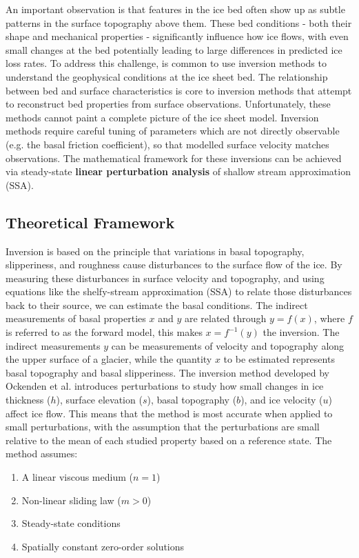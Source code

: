 An important observation is that features in the ice bed often show up as subtle patterns in the surface topography above them\cite{Ockenden_2022}. These bed conditions - both their shape and mechanical properties - significantly influence how ice flows, with even small changes at the bed potentially leading to large differences in predicted ice loss rates. To address this challenge, is common to use inversion methods to understand the geophysical conditions at the ice sheet bed.
The relationship between bed and surface characteristics is core to inversion methods that attempt to reconstruct bed properties from surface observations. Unfortunately, these methods cannot paint a complete picture of the ice sheet model. Inversion methods require careful tuning of parameters which are not directly observable  (e.g. the basal friction coefficient), so that modelled surface velocity matches observations. The mathematical framework for these inversions can be achieved via steady-state \textbf{linear perturbation analysis} of shallow stream approximation (SSA)\cite{Gudmundsson_2008}.

\subsection*{Theoretical Framework}

Inversion is based on the principle that variations in basal topography, slipperiness, and roughness cause disturbances to the surface flow of the ice. By measuring these disturbances in surface velocity and topography, and using equations like the shelfy-stream approximation (SSA) to relate those disturbances back to their source, we can estimate the basal conditions.
The indirect measurements of basal properties $x$ and $y$ are related through $y=f(x)$, where $f$ is referred to as the forward model, this makes  $x=f^{-1}(y)$ the inversion. The indirect measurements $y$ can be measurements of velocity and topography along the upper surface of a glacier, while the quantity $x$ to be estimated represents basal topography and basal slipperiness\cite{Gudmundsson_2008}.
The inversion method developed by Ockenden et al. introduces perturbations to study how small changes in ice thickness ($h$), surface elevation ($s$), basal topography ($b$), and ice velocity ($u$) affect ice flow. This means that the method is most accurate when applied to small perturbations, with the assumption that the perturbations are small relative to the mean of each studied property based on a reference state. The method assumes:
\begin{enumerate}
\item A linear viscous medium ($n=1$)
\item Non-linear sliding law ($m>0$)
\item Steady-state conditions
\item Spatially constant zero-order solutions
\end{enumerate}

